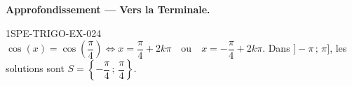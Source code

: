\textbf{Approfondissement — Vers la Terminale.}
\begin{corrige}{1SPE-TRIGO-EX-024}
$\cos(x) = \cos\!\left(\dfrac{\pi}{4}\right) \iff x = \dfrac{\pi}{4} + 2k\pi \quad \text{ou} \quad x = -\dfrac{\pi}{4} + 2k\pi$.
Dans $]-\pi \,;\, \pi]$, les solutions sont $S = \left\{-\dfrac{\pi}{4} \,;\, \dfrac{\pi}{4}\right\}$.
\end{corrige}

%
%
%
%
